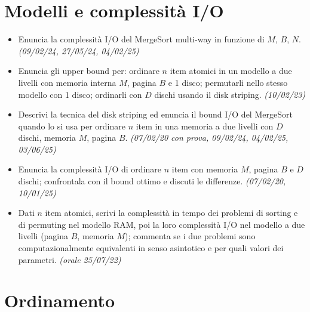 \section{Modelli e complessit\`a I/O}

\begin{itemize}[leftmargin=1.4em]
\item {}\hot Enuncia la complessit\`a I/O del MergeSort multi-way in funzione di $M$, $B$, $N$.
\emph{(09/02/24, 27/05/24, 04/02/25)}
\item {} Enuncia gli upper bound per: ordinare $n$ item atomici in un modello a due livelli con
memoria interna $M$, pagina $B$ e 1 disco; permutarli nello stesso modello con 1 disco; ordinarli con
$D$ dischi usando il disk striping. \emph{(10/02/23)}
\item {}\hot Descrivi la tecnica del disk striping ed enuncia il bound I/O del MergeSort quando lo
si usa per ordinare $n$ item in una memoria a due livelli con $D$ dischi, memoria $M$, pagina $B$.
\emph{(07/02/20 con prova, 09/02/24, 04/02/25, 03/06/25)}
\item {} Enuncia la complessit\`a I/O di ordinare $n$ item con memoria $M$, pagina $B$ e $D$
dischi; confrontala con il bound ottimo e discuti le differenze. \emph{(07/02/20, 10/01/25)}
\item {} Dati $n$ item atomici, scrivi la complessit\`a in tempo dei problemi di sorting e di
permuting nel modello RAM, poi la loro complessit\`a I/O nel modello a due livelli (pagina $B$,
memoria $M$); commenta se i due problemi sono computazionalmente equivalenti in senso asintotico e
per quali valori dei parametri. \emph{(orale 25/07/22)}
\end{itemize}

\section{Ordinamento}


